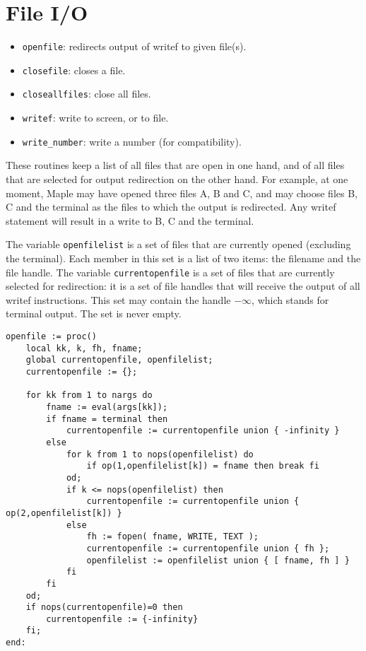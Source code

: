 \documentclass[a4paper,10pt]{article}
\begin{document}
\section{File I/O}

\begin{itemize}
\item   \verb+openfile+: redirects output of writef to given file(s).
\item   \verb+closefile+: closes a file.
\item   \verb+closeallfiles+: close all files.
\item   \verb+writef+: write to screen, or to file.
\item   \verb+write_number+: write a number (for compatibility).
\end{itemize}

These routines keep a list of all files that are open in one hand, and of all files
that are selected for output redirection on the other hand.  For example, at one
moment, Maple may have opened three files A, B and C, and may choose files B, C and the terminal
as the files to which the output is redirected.  Any writef statement will result in a write
to B, C and the terminal.

The variable \verb+openfilelist+ is a set of files that are currently opened (excluding the terminal).
Each member in this set is a list of two items: the filename and the file handle.  The variable
\verb+currentopenfile+ is a set of files that are currently selected for redirection: it is a set
of file handles that will receive the output of all writef instructions.  This set may contain the
handle $-\infty$, which stands for terminal output.  The set is never empty.

\begin{lstlisting}[name=tools]
openfile := proc()
    local kk, k, fh, fname;
    global currentopenfile, openfilelist;
    currentopenfile := {};

    for kk from 1 to nargs do
        fname := eval(args[kk]);
        if fname = terminal then
            currentopenfile := currentopenfile union { -infinity }
        else
            for k from 1 to nops(openfilelist) do
                if op(1,openfilelist[k]) = fname then break fi
            od;
            if k <= nops(openfilelist) then
                currentopenfile := currentopenfile union { op(2,openfilelist[k]) }
            else
                fh := fopen( fname, WRITE, TEXT );
                currentopenfile := currentopenfile union { fh };
                openfilelist := openfilelist union { [ fname, fh ] }
            fi
        fi
    od;
    if nops(currentopenfile)=0 then
        currentopenfile := {-infinity}
    fi;
end:
\end{lstlisting}
\end{document}
